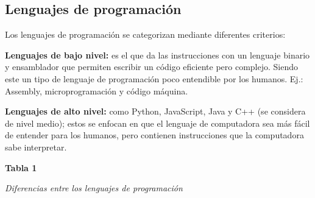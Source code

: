 \documentclass[12pt,letterpaper]{article}
\begin{document}
\subsection{Lenguajes de programación}
Los lenguajes de programación se categorizan mediante diferentes criterios:

\textbf{Lenguajes de bajo nivel:} es el que da las instrucciones con un lenguaje binario y ensamblador que permiten escribir un código eficiente pero complejo. Siendo este un tipo de lenguaje de programación poco entendible por los humanos. Ej.: Assembly, microprogramación y código máquina.

\textbf{Lenguajes de alto nivel:} como Python, JavaScript, Java y C++ (se considera de nivel medio); estos se enfocan en que el lenguaje de computadora sea más fácil de entender para los humanos, pero contienen instrucciones que la computadora sabe interpretar.

\begin{center}
\singlespacing
\textbf{Tabla 1}\par\smallskip
\textit{Diferencias entre los lenguajes de programación}
\end{center}
\end{document}
